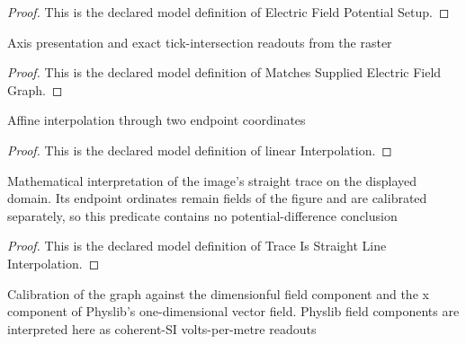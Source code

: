 \begin{proof}
  This is the declared model definition of Electric Field Potential Setup.
\end{proof}
\begin{definition}
  \label{def:physics:phyx-mini-0868:phyxminiproblems-problemphyxmini0868-matchessuppliedelectricfieldgraph}
  Axis presentation and exact tick-intersection readouts from the raster
\end{definition}
\begin{proof}
  This is the declared model definition of Matches Supplied Electric Field Graph.
\end{proof}
\begin{definition}
  \label{def:physics:phyx-mini-0868:phyxminiproblems-problemphyxmini0868-linearinterpolation}
  Affine interpolation through two endpoint coordinates
\end{definition}
\begin{proof}
  This is the declared model definition of linear Interpolation.
\end{proof}
\begin{definition}
  \label{def:physics:phyx-mini-0868:phyxminiproblems-problemphyxmini0868-traceisstraightlineinterpolation}
  Mathematical interpretation of the image's straight trace on the displayed domain. Its endpoint ordinates remain fields of the figure and are calibrated separately, so this predicate contains no potential-difference conclusion
\end{definition}
\begin{proof}
  This is the declared model definition of Trace Is Straight Line Interpolation.
\end{proof}
\begin{definition}
  \label{def:physics:phyx-mini-0868:phyxminiproblems-problemphyxmini0868-electricfieldreadoutmatchesfigure}
  Calibration of the graph against the dimensionful field component and the x component of Physlib's one-dimensional vector field. Physlib field components are interpreted here as coherent-SI volts-per-metre readouts
\end{definition}
